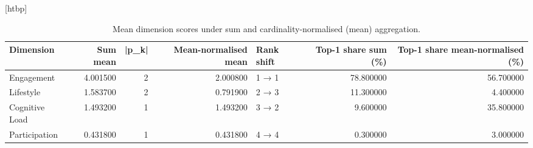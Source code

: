 \begin{table}
\small[htbp]
\caption{Mean dimension scores under sum and cardinality-normalised (mean) aggregation.}
\label{tab:A06b_dimension_scores}
\begin{tabular}{lrrrlrr}
\toprule
Dimension & Sum mean & |p\_k| & Mean-normalised mean & Rank shift & Top-1 share sum (\%) & Top-1 share mean-normalised (\%) \\
\midrule
Engagement & 4.001500 & 2 & 2.000800 & 1 → 1 & 78.800000 & 56.700000 \\
Lifestyle & 1.583700 & 2 & 0.791900 & 2 → 3 & 11.300000 & 4.400000 \\
Cognitive Load & 1.493200 & 1 & 1.493200 & 3 → 2 & 9.600000 & 35.800000 \\
Participation & 0.431800 & 1 & 0.431800 & 4 → 4 & 0.300000 & 3.000000 \\
\bottomrule
\end{tabular}
\end{table}
